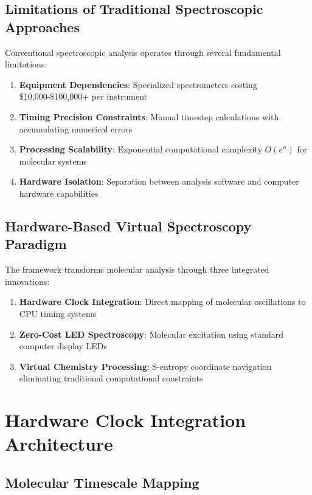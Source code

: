 \documentclass[12pt,a4paper]{article}
\begin{document}
\subsection{Limitations of Traditional Spectroscopic Approaches}

Conventional spectroscopic analysis operates through several fundamental limitations:

\begin{enumerate}
\item \textbf{Equipment Dependencies}: Specialized spectrometers costing \$10,000-\$100,000+ per instrument
\item \textbf{Timing Precision Constraints}: Manual timestep calculations with accumulating numerical errors
\item \textbf{Processing Scalability}: Exponential computational complexity $O(e^n)$ for molecular systems
\item \textbf{Hardware Isolation}: Separation between analysis software and computer hardware capabilities
\end{enumerate}

\subsection{Hardware-Based Virtual Spectroscopy Paradigm}

The framework transforms molecular analysis through three integrated innovations:

\begin{enumerate}
\item \textbf{Hardware Clock Integration}: Direct mapping of molecular oscillations to CPU timing systems
\item \textbf{Zero-Cost LED Spectroscopy}: Molecular excitation using standard computer display LEDs
\item \textbf{Virtual Chemistry Processing}: S-entropy coordinate navigation eliminating traditional computational constraints
\end{enumerate}

\section{Hardware Clock Integration Architecture}

\subsection{Molecular Timescale Mapping}
\end{document}
